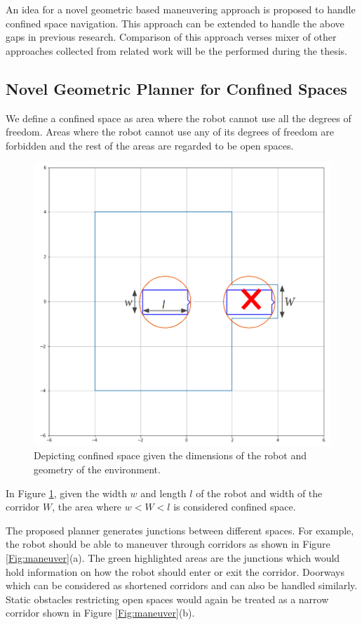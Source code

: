 \documentclass[rnd]{mas_proposal}
\begin{document}
An idea for a novel geometric based maneuvering approach is proposed to handle confined space navigation. This approach can be extended to handle the above gaps in previous research. Comparison of this approach verses mixer of other approaches collected from related work will be the performed during the thesis.

\subsection{Novel Geometric Planner for Confined Spaces}
We define a confined space as area where the robot cannot use all the degrees of freedom. Areas where the robot cannot use any of its degrees of freedom are forbidden and the rest of the areas are regarded to be open spaces. 

\begin{figure}[!ht]
\centering
\includegraphics[scale=0.25]{images/Confined.png}
\caption{Depicting confined space given the dimensions of the robot and geometry of the environment.}
\label{Fig:confined}
\end{figure}

In Figure \ref{Fig:confined}, given the width $w$ and length $l$ of the robot and width of the corridor $W$, the area where $w < W < l$ is considered confined space.

The proposed planner generates junctions between different spaces. For example, the robot should be able to maneuver through corridors as shown in Figure \ref{Fig:maneuver}(a). The green highlighted areas are the junctions which would hold information on how the robot should enter or exit the corridor. Doorways which can be considered as shortened corridors and can also be handled similarly. Static obstacles restricting open spaces would again be treated as a narrow corridor shown in Figure \ref{Fig:maneuver}(b). 
\end{document}
